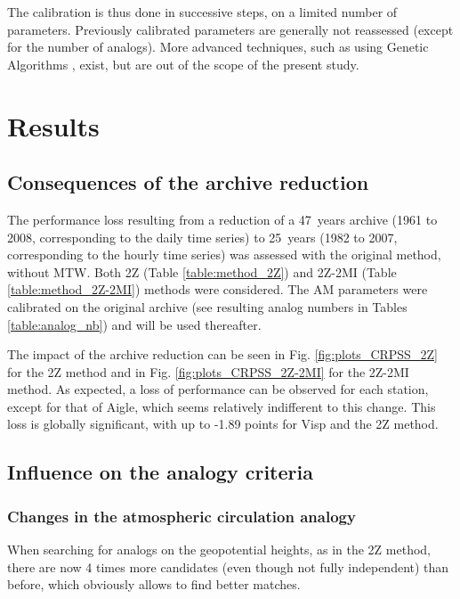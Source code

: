 \documentclass[hess, manuscript]{copernicus}
\begin{document}
The calibration is thus done in successive steps, on a limited number of parameters. Previously calibrated parameters are generally not reassessed (except for the number of analogs). More advanced techniques, such as using Genetic Algorithms \citep{Horton2016}, exist, but are out of the scope of the present study.


\section{Results}


\subsection{Consequences of the archive reduction}
\label{sec:archive_reduction}

The performance loss resulting from a reduction of a 47~years archive (1961 to 2008, corresponding to the daily time series) to 25~years (1982 to 2007, corresponding to the hourly time series) was assessed with the original method, without MTW. Both 2Z (Table \ref{table:method_2Z}) and 2Z-2MI (Table \ref{table:method_2Z-2MI}) methods were considered. The AM parameters were calibrated on the original archive (see resulting analog numbers in Tables \ref{table:analog_nb}) and will be used thereafter.

The impact of the archive reduction can be seen in Fig. \ref{fig:plots_CRPSS_2Z} for the 2Z method and in Fig. \ref{fig:plots_CRPSS_2Z-2MI} for the 2Z-2MI method. As expected, a loss of performance can be observed for each station, except for that of Aigle, which seems relatively indifferent to this change. This loss is globally significant, with up to -1.89 points for Visp and the 2Z method. 


\subsection{Influence on the analogy criteria}
\label{sec:influence_criteria}

\subsubsection{Changes in the atmospheric circulation analogy}

When searching for analogs on the geopotential heights, as in the 2Z method, there are now 4 times more candidates (even though not fully independent) than before, which obviously allows to find better matches.
\end{document}
